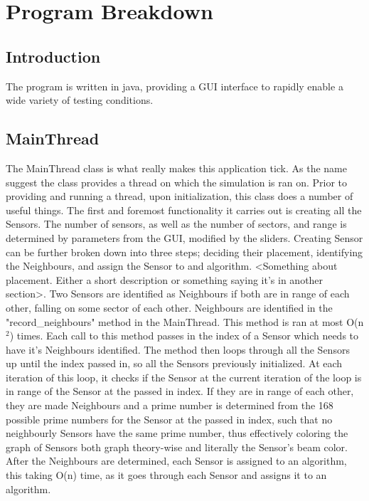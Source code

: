 \section{Program Breakdown}

\subsection{Introduction}
The program is written in java, providing a GUI interface to rapidly enable a wide variety of testing conditions. 

\subsection{MainThread}

The MainThread class is what really makes this application tick. As the name
suggest the class provides a thread on which the simulation is ran on. Prior to providing and running a thread, upon initialization, this class does a number of useful things. The first and foremost functionality it carries out is creating all
the Sensors. The number of sensors, as well as the number of sectors, and range is determined by parameters from the GUI, modified by the sliders. Creating Sensor
can be further broken down into three steps; deciding their placement, identifying the Neighbours, and assign the Sensor to and algorithm. <Something about
placement. Either a short description or something saying it's in another
section>.  Two Sensors are identified as Neighbours if both are in range of each other, falling on some sector of each other. Neighbours are identified in the
"record\_neighbours" method in the MainThread. This method is ran at most 
O(n$^{2}$)
times. Each call to this method passes in the index of a Sensor which needs to 
have it's Neighbours identified. The method then loops through all the Sensors up 
until the index passed in, so all the Sensors previously initialized. At each 
iteration of this loop, it checks if the Sensor at the current iteration of the 
loop is in range of the Sensor at the passed in index. If they are in range of 
each other, they are made Neighbours and a prime number is determined from the 168 
possible prime numbers for the Sensor at the passed in index, such that no 
neighbourly Sensors have the same prime number, thus effectively coloring the 
graph of Sensors both graph theory-wise and literally the Sensor's beam color. 
After the Neighbours are determined, each Sensor is assigned to an algorithm, this 
taking O(n) time, as it goes through each Sensor and assigns it to an algorithm. 
